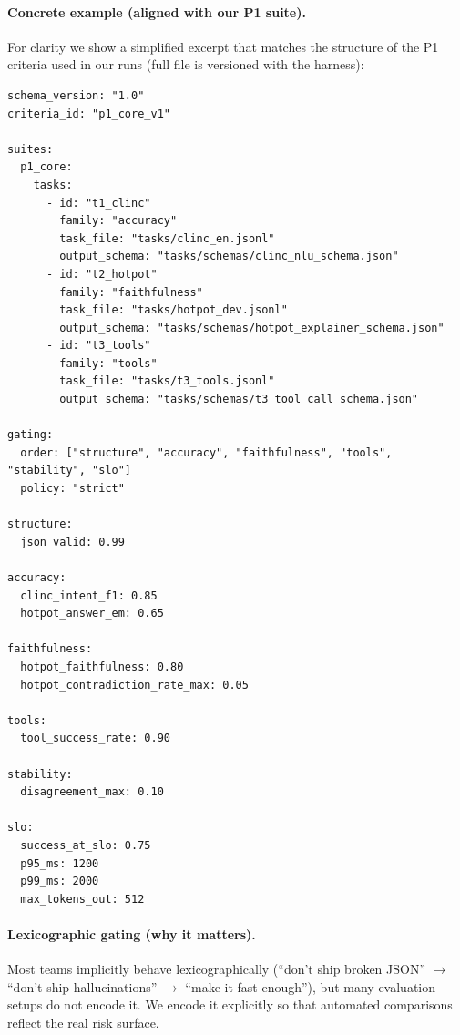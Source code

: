 \paragraph{Concrete example (aligned with our P1 suite).}
For clarity we show a simplified excerpt that matches the structure of the P1 criteria used in our runs (full file is versioned with the harness):

\begin{lstlisting}[basicstyle=\ttfamily\small]
schema_version: "1.0"
criteria_id: "p1_core_v1"

suites:
  p1_core:
    tasks:
      - id: "t1_clinc"
        family: "accuracy"
        task_file: "tasks/clinc_en.jsonl"
        output_schema: "tasks/schemas/clinc_nlu_schema.json"
      - id: "t2_hotpot"
        family: "faithfulness"
        task_file: "tasks/hotpot_dev.jsonl"
        output_schema: "tasks/schemas/hotpot_explainer_schema.json"
      - id: "t3_tools"
        family: "tools"
        task_file: "tasks/t3_tools.jsonl"
        output_schema: "tasks/schemas/t3_tool_call_schema.json"

gating:
  order: ["structure", "accuracy", "faithfulness", "tools", "stability", "slo"]
  policy: "strict"

structure:
  json_valid: 0.99

accuracy:
  clinc_intent_f1: 0.85
  hotpot_answer_em: 0.65

faithfulness:
  hotpot_faithfulness: 0.80
  hotpot_contradiction_rate_max: 0.05

tools:
  tool_success_rate: 0.90

stability:
  disagreement_max: 0.10

slo:
  success_at_slo: 0.75
  p95_ms: 1200
  p99_ms: 2000
  max_tokens_out: 512
\end{lstlisting}

\paragraph{Lexicographic gating (why it matters).}
Most teams implicitly behave lexicographically (``don’t ship broken JSON'' $\rightarrow$ ``don’t ship hallucinations'' $\rightarrow$ ``make it fast enough''), but many evaluation setups do not encode it.
We encode it explicitly so that automated comparisons reflect the real risk surface.

